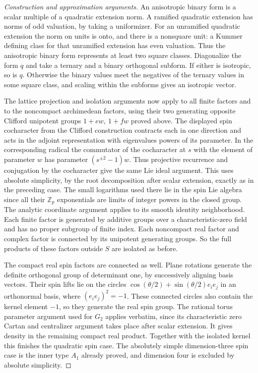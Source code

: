 \documentclass[11pt,a4paper,openany,oneside]{book}
\theoremstyle{resultstyle}
\theoremstyle{definition}
\numberwithin{equation}{chapter}
\begin{document}
\begin{proof}[Construction and approximation arguments]
An anisotropic binary form is a scalar multiple of a
quadratic extension norm. A ramified quadratic extension
has norms of odd valuation, by taking a uniformizer. For
an unramified quadratic extension the norm on units is
onto, and there is a nonsquare unit: a Kummer defining
class for that unramified extension has even valuation.
Thus the anisotropic binary form represents at least two
square classes. Diagonalize the form \(q\) and take a
ternary and a binary orthogonal subform. If either is
isotropic, so is \(q\). Otherwise the binary values meet
the negatives of the ternary values in some square class,
and scaling within the subforms gives an isotropic vector.

The lattice projection and isolation arguments now apply
to all finite factors and to the noncompact archimedean
factors, using their two generating opposite Clifford
unipotent groups \(1+ew,\ 1+fw\) proved above. The displayed
spin cocharacter from the Clifford construction contracts
each in one direction and acts in the adjoint representation
with eigenvalues powers of its parameter. In the corresponding
radical the commutator of the cocharacter at \(s\) with the
element of parameter \(w\) has parameter
\((s^{\pm 2}-1)w\). Thus projective
recurrence and conjugation by the cocharacter give the same
Lie ideal argument. This uses absolute simplicity, by
the root decomposition after scalar extension, exactly as
in the preceding case. The small logarithms used there
lie in the spin Lie algebra since all their \(\mathbb Z_p\)
exponentials are limits of integer powers in the closed
group. The analytic coordinate argument applies to its
smooth identity neighborhood. Each finite factor is
generated by additive groups over a characteristic-zero
field and has no proper subgroup of finite index. Each
noncompact real factor and complex factor is connected
by its unipotent generating groups. So the full products
of these factors outside \(S\) are isolated as before.

The compact real spin factors are connected as well.
Plane rotations generate the definite orthogonal group
of determinant one, by successively aligning basis vectors.
Their spin lifts lie on the circles
\(\cos(\theta/2)+\sin(\theta/2)e_ie_j\) in an orthonormal
basis, where \((e_ie_j)^2=-1\). These connected circles
also contain the kernel element \(-1\), so they generate
the real spin group. The rational torus parameter argument
used for \(G_2\) applies verbatim, since its characteristic
zero Cartan and centralizer argument takes place after
scalar extension. It gives density in the remaining
compact real product. Together with the isolated kernel
this finishes the quadratic spin case. The absolutely
simple dimension-three spin case is the inner type \(A_1\)
already proved, and dimension four is excluded by absolute
simplicity.


\end{proof}
\end{document}
